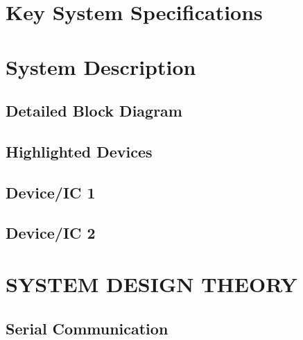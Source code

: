 \documentclass{hitec}
\begin{document}



\section{Key System Specifications}





\section{System Description}





\subsection{Detailed Block Diagram}




\subsection{Highlighted Devices}





\subsection{Device/IC 1}




\subsection{Device/IC 2}





\section{SYSTEM DESIGN THEORY}





\subsection{Serial Communication}
\end{document}
